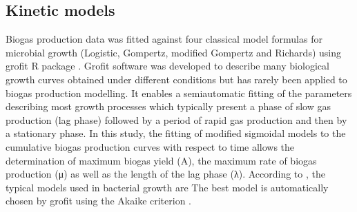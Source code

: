 \subsection{Kinetic models}
Biogas production data was fitted against four classical model formulas for microbial growth (Logistic, Gompertz, modified Gompertz and Richards) using grofit R package \cite{Kahm_2010}. Grofit software was developed to describe many biological growth curves obtained under different conditions but has rarely been applied to biogas production modelling. It enables a semiautomatic fitting of the parameters describing most growth processes which typically present a phase of slow gas production (lag phase) followed by a period of rapid gas production and then by a stationary phase. In this study, the fitting of modified sigmoidal models to the cumulative biogas production curves  with respect to time allows the determination of maximum biogas yield (A), the maximum rate of biogas production (μ) as well as the length of the lag phase (λ). According to \cite{Zwietering1990}, the typical models used in bacterial growth are  The best model is automatically chosen by grofit using the Akaike criterion \cite{Hasenbrink_2006}.